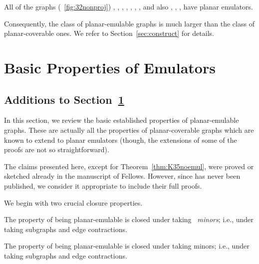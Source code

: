 \documentclass[envcountsect,envcountsame]{llncs}
\begin{document}
\begin{theorem}
\label{thm:main}
All of the graphs (\figurename~\ref{fig:32nonproj})
, , , ,
, , , and also , ,
,  have planar emulators.
\end{theorem}
Consequently, the class of planar-emulable graphs is much larger than
the class of planar-coverable ones.
We refer to Section~\ref{sec:construct} for details.








\section{Basic Properties of Emulators}
\label{sec:basic}
\begin{onlyaccum}
\subsection{Additions to Section~\ref{sec:basic}}
\end{onlyaccum}

In this section, we review
the basic established properties of planar-emulable graphs.
These are actually all the properties of planar-coverable graphs
which are known to extend to planar emulators
(though, the extensions of some of the proofs are not so straightforward).

The claims presented here, except for Theorem~\ref{thm:K35noemul},
were proved or sketched already in the manuscript \cite{cit:femul} of
Fellows.
However, since \cite{cit:femul} has never been published, we consider it
appropriate to include their full proofs.


We begin with two crucial closure properties.

\begin{proposition}
\label{prop:clminor}
The property of being planar-emulable is closed under taking \mbox{\em
minors}; i.e., under taking subgraphs and edge contractions.
\end{proposition}
\begin{onlyaccum}
{\def\thetheorem{\ref{prop:clminor}}
\begin{proposition}
The property of being planar-emulable is closed under taking \mbox{minors}; 
i.e., under taking subgraphs and edge contractions.
\end{proposition}}
\end{onlyaccum}
\end{document}
